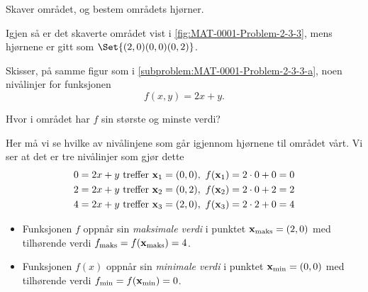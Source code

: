 \documentclass[a4paper,11pt]{article}
\begin{document}
\begin{subproblem}
    \label{subproblem:MAT-0001-Problem-2-3-3-a}
    Skaver området, og bestem områdets hjørner.
\end{subproblem}

\begin{solution}
    Igjen så er det skaverte området vist i \cref{fig:MAT-0001-Problem-2-3-3},
    mens hjørnene er gitt som $\Set{(2,0) (0,0) (0,2)}$.
\end{solution}

\begin{subproblem}
    Skisser, på samme figur som i \cref{subproblem:MAT-0001-Problem-2-3-3-a}, 
    noen nivålinjer for funksjonen
    \begin{equation*}
        f(x, y) = 2x + y.
    \end{equation*}
\end{subproblem}

\begin{subproblem}
    Hvor i området har $f$ sin største og minste verdi?
\end{subproblem}

\begin{solution}
    Her må vi se hvilke av nivålinjene som går igjennom hjørnene til området vårt.
    Vi ser at det er tre nivålinjer som gjør dette
    \begin{align*}
        & 0 = 2x + y \ \text{treffer} \ \vek{x}_1 = (0,0), \ f(\vek{x}_1) = 2 \cdot 0 + 0 = 0 \\
        & 2 = 2x + y \ \text{treffer} \ \vek{x}_2 = (0,2), \ f(\vek{x}_2) = 2 \cdot 0 + 2 = 2 \\
        & 4 = 2x + y \ \text{treffer} \ \vek{x}_3 = (2,0), \ f(\vek{x}_3) = 2 \cdot 2 + 0 = 4
    \end{align*}
    \begin{itemize}
        \item Funksjonen $f$ oppnår sin \emph{maksimale verdi} i punktet 
          $\mathbf{x}_{\text{maks}} = (2,0)$ med tilhørende verdi 
          $f_{\text{maks}} = f(\mathbf{x}_{\text{maks}}) = 4$.
        \item Funksjonen $f(x)$ oppnår sin \emph{minimale verdi} i punktet 
          $\mathbf{x}_{\text{min}} = (0,0)$ med tilhørende verdi 
          $f_{\text{min}} = f(\mathbf{x}_{\text{min}}) = 0$.
    \end{itemize}
\end{solution}

\end{document}
